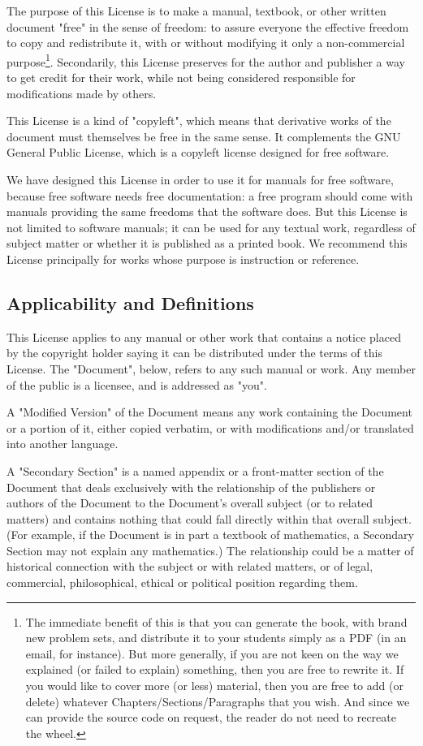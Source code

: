 	The purpose of this License is to make a manual, textbook, or other written document "free" in the sense of freedom: to assure everyone the effective freedom to copy and redistribute it, with or without modifying it only a non-commercial purpose\footnote{The immediate benefit of this is that you can generate the book, with brand new  problem sets, and distribute it to your students simply as a PDF (in an email, for instance). But more generally, if you are not keen on the way we explained (or failed to explain) something, then you are free to rewrite it. If you would like to cover more (or less) material, then you are free to add (or delete) whatever Chapters/Sections/Paragraphs
that you wish. And since we can provide the source code on request, the reader do not need to recreate the wheel.}. Secondarily, this License preserves for the author and publisher a way to get credit for their work, while not being considered responsible for modifications made by others.

	This License is a kind of "copyleft", which means that derivative works of the document must themselves be free in the same sense. It complements the GNU General Public License, which is a copyleft license designed for free software. 

	We have designed this License in order to use it for manuals for free software, because free software needs free documentation: a free program should come with manuals providing the same freedoms that the software does. But this License is not limited to software manuals; it can be used for any textual work, regardless of subject matter or whether it is published as a printed book. We recommend this License principally for works whose purpose is instruction or reference. 

	\subsection{Applicability and Definitions}
	This License applies to any manual or other work that contains a notice placed by the copyright holder saying it can be distributed under the terms of this License. The "Document", below, refers to any such manual or work. Any member of the public is a licensee, and is addressed as "you". 

	A "Modified Version" of the Document means any work containing the Document or a portion of it, either copied verbatim, or with modifications and/or translated into another language. 

	A "Secondary Section" is a named appendix or a front-matter section of the Document that deals exclusively with the relationship of the publishers or authors of the Document to the Document's overall subject (or to related matters) and contains nothing that could fall directly within that overall subject. (For example, if the Document is in part a textbook of mathematics, a Secondary Section may not explain any mathematics.) The relationship could be a matter of historical connection with the subject or with related matters, or of legal, commercial, philosophical, ethical or political position regarding them. 

